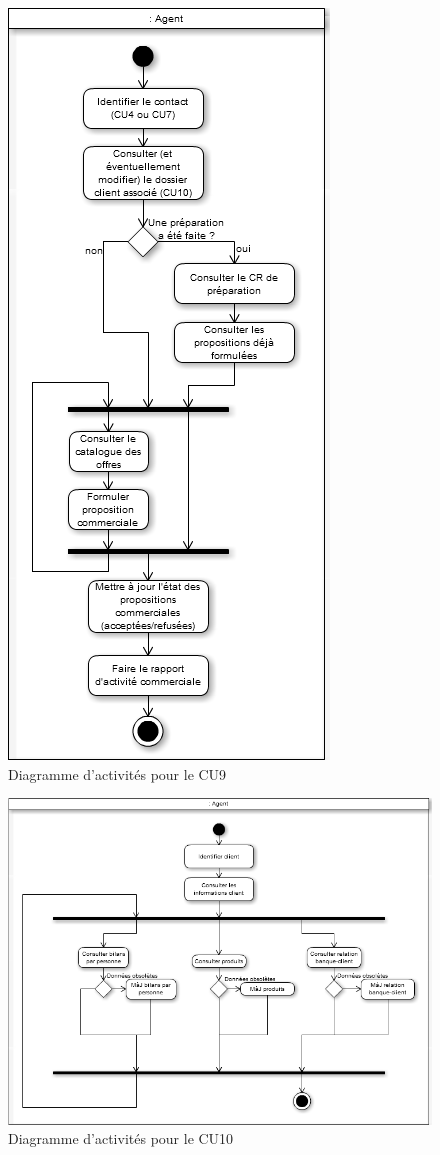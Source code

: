 \begin{figure}[H]
	\begin{center}
		\includegraphics[scale=0.4]{Includes/SOA-Activite-CU9.png}
		\caption{Diagramme d'activités pour le CU9}
	\end{center}
\end{figure}

\begin{figure}[H]
	\begin{center}
		\includegraphics[scale=0.4]{Includes/SOA-Activite-CU10.png}
		\caption{Diagramme d'activités pour le CU10}
	\end{center}
\end{figure}


